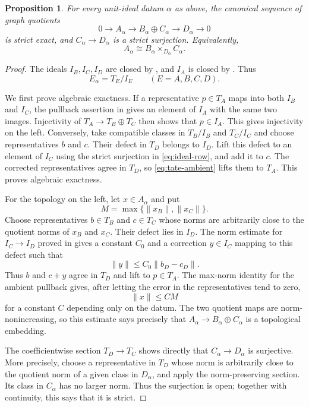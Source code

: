 \documentclass[11pt,reqno]{amsart}
\newtheorem{proposition}[proposition]{Proposition}
\theoremstyle{definition}
\begin{document}
\begin{proposition}\label{prop:localized-milnor}
For every unit-ideal datum $\alpha$ as above, the canonical sequence of graph
quotients
\[
  0\longrightarrow A_\alpha\longrightarrow
  B_\alpha\oplus C_\alpha\longrightarrow D_\alpha\longrightarrow 0
\]
is strict exact, and $C_\alpha\to D_\alpha$ is a strict surjection.  Equivalently,
\[
  A_\alpha\cong B_\alpha\times_{D_\alpha}C_\alpha.
\]
\end{proposition}

\begin{proof}
The ideals $I_B,I_C,I_D$ are closed by , and $I_A$ is
closed by .  Thus
\[
  E_\alpha=T_E/I_E
  \qquad(E=A,B,C,D).
\]

We first prove algebraic exactness.  If a representative $p\in T_A$ maps
into both $I_B$ and $I_C$, the pullback assertion in
 gives an element of $I_A$ with the same two images.
Injectivity of $T_A\to T_B\oplus T_C$ then shows that $p\in I_A$.  This gives
injectivity on the left.  Conversely, take compatible classes in
$T_B/I_B$ and $T_C/I_C$ and choose representatives $b$ and $c$.  Their
defect in $T_D$ belongs to $I_D$.  Lift this defect to an element of $I_C$
using the strict surjection in \eqref{eq:ideal-row}, and add it to $c$.
The corrected representatives agree in $T_D$, so
\eqref{eq:tate-ambient} lifts them to $T_A$.  This proves
algebraic exactness.

For the topology on the left, let $x\in A_\alpha$ and put
\[
  M=\max\{\lVert x_B\rVert,\lVert x_C\rVert\}.
\]
Choose representatives $b\in T_B$ and $c\in T_C$ whose norms are
arbitrarily close to the quotient norms of $x_B$ and $x_C$.  Their defect
lies in $I_D$.  The norm estimate for $I_C\to I_D$ proved in
 gives a constant $C_0$ and a correction
$y\in I_C$ mapping to this defect such that
\[
  \lVert y\rVert\leq C_0\lVert b_D-c_D\rVert.
\]
Thus $b$ and $c+y$ agree in $T_D$ and lift to
$p\in T_A$.  The max-norm identity for the ambient pullback gives, after
letting the error in the representatives tend to zero,
\[
  \lVert x\rVert\leq C M
\]
for a constant $C$ depending only on the datum.  The two quotient maps are
norm-nonincreasing, so this estimate says precisely that
$A_\alpha\to B_\alpha\oplus C_\alpha$ is a topological embedding.

The coefficientwise section $T_D\to T_C$ shows directly that
$C_\alpha\to D_\alpha$ is surjective.  More precisely, choose a
representative in $T_D$ whose norm is arbitrarily close to the quotient norm
of a given class in $D_\alpha$, and apply the norm-preserving section.  Its
class in $C_\alpha$ has no larger norm.  Thus the surjection is open;
together with continuity, this says that it is strict.

\end{proof}
\end{document}
